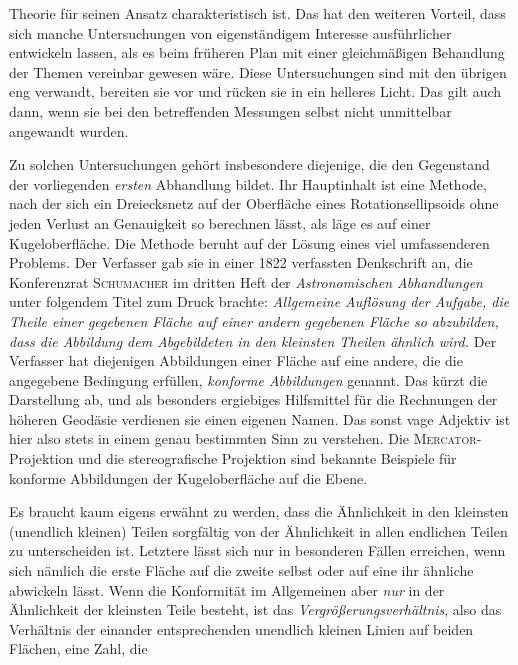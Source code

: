 %
Theorie für seinen Ansatz charakteristisch ist. Das hat den weiteren Vorteil, dass sich manche Untersuchungen von eigenständigem Interesse ausführlicher entwickeln lassen, als es beim früheren Plan mit einer gleichmäßigen Behandlung der Themen vereinbar gewesen wäre. Diese Untersuchungen sind mit den übrigen eng verwandt, bereiten sie vor und rücken sie in ein helleres Licht. Das gilt auch dann, wenn sie bei den betreffenden Messungen selbst nicht unmittelbar angewandt wurden.

Zu solchen Untersuchungen gehört insbesondere diejenige, die den Gegenstand der vorliegenden \textit{ersten} Abhandlung bildet. Ihr Hauptinhalt ist eine Methode, nach der sich ein Dreiecksnetz auf der Oberfläche eines Rotationsellipsoids ohne jeden Verlust an Genauigkeit so berechnen lässt, als läge es auf einer Kugeloberfläche. Die Methode beruht auf der Lösung eines viel umfassenderen Problems. Der Verfasser gab sie in einer 1822 verfassten Denkschrift an, die Konferenzrat \textsc{Schumacher} im dritten Heft der \textit{Astronomischen Abhandlungen} unter folgendem Titel zum Druck brachte: \textit{Allgemeine Auflösung der Aufgabe, die Theile einer gegebenen Fläche auf einer andern gegebenen Fläche so abzubilden, dass die Abbildung dem Abgebildeten in den kleinsten Theilen ähnlich wird.} Der Verfasser hat diejenigen Abbildungen einer Fläche auf eine andere, die die angegebene Bedingung erfüllen, \textit{konforme Abbildungen} genannt. Das kürzt die Darstellung ab, und als besonders ergiebiges Hilfsmittel für die Rechnungen der höheren Geodäsie verdienen sie einen eigenen Namen. Das sonst vage Adjektiv ist hier also stets in einem genau bestimmten Sinn zu verstehen. Die \textsc{Mercator}-Projektion und die stereografische Projektion sind bekannte Beispiele für konforme Abbildungen der Kugeloberfläche auf die Ebene.

Es braucht kaum eigens erwähnt zu werden, dass die Ähnlichkeit in den kleinsten (unendlich kleinen) Teilen sorgfältig von der Ähnlichkeit in allen endlichen Teilen zu unterscheiden ist. Letztere lässt sich nur in besonderen Fällen erreichen, wenn sich nämlich die erste Fläche auf die zweite selbst oder auf eine ihr ähnliche abwickeln lässt. Wenn die Konformität im Allgemeinen aber \textit{nur} in der Ähnlichkeit der kleinsten Teile besteht, ist das \textit{Vergrößerungsverhältnis}, also das Verhältnis der einander entsprechenden unendlich kleinen Linien auf beiden Flächen, eine Zahl, die %

